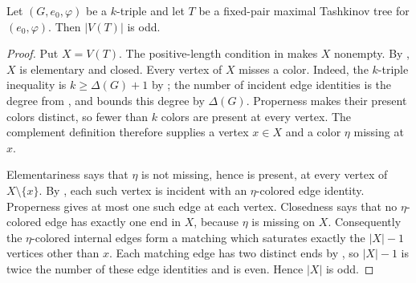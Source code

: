\begin{lemma}
Let $(G,e_0,\varphi)$ be a $k$-triple and let $T$ be a fixed-pair maximal
Tashkinov tree for $(e_0,\varphi)$.  Then $|V(T)|$ is odd.
\end{lemma}
\begin{proof}
Put $X=V(T)$.  The positive-length condition in 
makes $X$ nonempty.  By , $X$ is
elementary and closed.  Every vertex of $X$ misses a color.  Indeed, the
$k$-triple inequality is $k\geq\Delta(G)+1$ by ; the
number of incident edge identities is the degree from ,
and  bounds this degree by $\Delta(G)$.  Properness
makes their present colors distinct, so fewer than $k$
colors are present at every vertex.  The complement definition
 therefore supplies a vertex $x\in X$ and a color
$\eta$ missing at $x$.

Elementariness says that $\eta$ is not missing, hence is present, at every
vertex of $X\setminus\{x\}$.  By , each such vertex
is incident with an $\eta$-colored edge identity.  Properness gives at most
one such edge at each vertex.  Closedness says that no $\eta$-colored edge
has exactly one end in $X$, because $\eta$ is missing on $X$.  Consequently
the $\eta$-colored internal edges form a matching which saturates exactly
the $|X|-1$ vertices other than $x$.  Each matching edge has two distinct
ends by , so $|X|-1$ is twice the number of
these edge identities and is even.  Hence $|X|$ is odd.
\end{proof}
